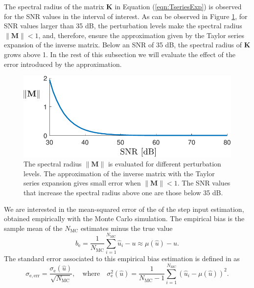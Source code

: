 The spectral radius of the matrix $\mathbf{K}$ in Equation (\ref{eqn:TseriesExp}) is observed for the SNR values in the interval of interest.
As can be observed in Figure \ref{fig:spectral_radius}, for SNR values larger than 35 dB, the perturbation levels make the spectral radius $\| \mathbf{M} \| < 1$, and, therefore, ensure the approximation given by the Taylor series expansion of the inverse matrix. 
Below an SNR of 35 dB, the spectral radius of $\mathbf{K}$  grows above 1. 
In the rest of this subsection we will evaluate the effect of the error introduced by the approximation.

\begin{figure}[htb!]
 \centering
 \includegraphics[width=0.69\columnwidth]{./ChapterStatisticalAnalysis/fig/Fig_6.pdf} 
  \caption{ \label{fig:spectral_radius} 
  \color{blue} The spectral radius $\| \mathbf{M} \|$ is evaluated for different perturbation levels. The approximation of the inverse matrix with the Taylor series expansion gives small error when $\| \mathbf{M} \| < 1$. The SNR values that increase the spectral radius above one are those below 35 dB\color{black}. }
\end{figure}


We are interested in the mean-squared error of the of the step input estimation, obtained empirically with the Monte Carlo simulation\color{black}.
The empirical bias is the sample mean of the $N_{\mathrm{MC}}$ estimates minus the true value
 \begin{equation} {b}_\mathrm{e} = \frac{1}{N_{\mathrm{MC}}} \sum_{i=1}^{N_{\mathrm{MC}}}{ \widehat{u}_i - u } \approx \mu \left( \widehat{u} \right) - u. \end{equation}
The standard error associated to this empirical bias estimation is defined in \citet{Hammersley75} as 
\begin{equation} \sigma_\mathrm{e, err} = \frac{\sigma_\mathrm{e} \left( \widehat{u} \right) }{\sqrt{N_{\mathrm{MC}}}}, \quad \mathrm{where} \quad \sigma_\mathrm{e}^2 \left( \widehat{u} \right) = \frac{1}{N_{\mathrm{MC}}-1} \sum_{i=1}^{N_{\mathrm{MC}}}{ \left( { \widehat{u}}_i - \mu \left( \widehat{u} \right) \right)^2 } . \end{equation} 

